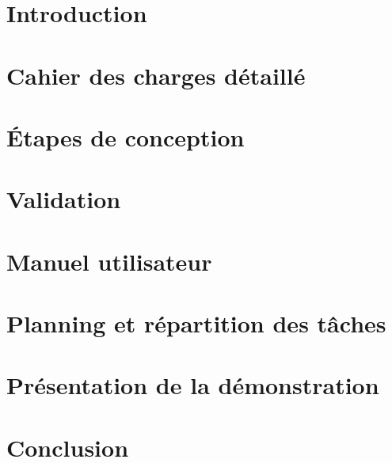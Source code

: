
\section{Introduction}


\section{Cahier des charges détaillé}


\section{\'{E}tapes de conception}


\section{Validation}


\section{Manuel utilisateur}


\section{Planning et répartition des tâches}


\section{Présentation de la démonstration}


\section{Conclusion}


\pagebreak


\pagebreak




\pagebreak
\printnomenclature
